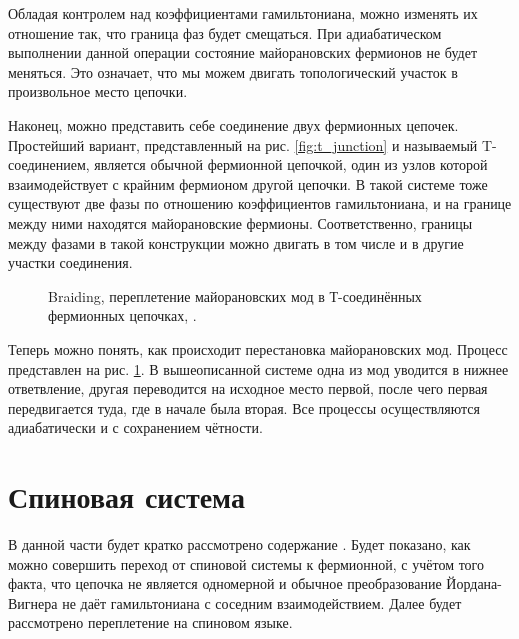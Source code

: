 \documentclass[a4paper,12pt]{article}
\theoremstyle{plain} %
\theoremstyle{definition} %
\theoremstyle{remark} %
\begin{document}
Обладая контролем над коэффициентами гамильтониана, можно изменять их отношение так, что граница фаз будет смещаться. При адиабатическом выполнении данной операции состояние майорановских фермионов не будет меняться. Это означает, что мы можем двигать топологический участок в произвольное место цепочки.

Наконец, можно представить себе соединение двух фермионных цепочек. Простейший вариант, представленный на рис. \ref{fig:t_junction} и называемый T-соединением, является обычной фермионной цепочкой, один из узлов которой взаимодействует с крайним фермионом другой цепочки. В такой системе тоже существуют две фазы по отношению коэффициентов гамильтониана, и на границе между ними находятся майорановские фермионы. Соответственно, границы между фазами в такой конструкции можно двигать в том числе и в другие участки соединения.

\begin{figure}
    \centering
    \caption{Braiding, переплетение майорановских мод в Т-соединённых фермионных цепочках, \cite{braiding}.}
    \label{fig:braiding}
\end{figure}

Теперь можно понять, как происходит перестановка майорановских мод. Процесс представлен на рис. \ref{fig:braiding}. В вышеописанной системе одна из мод уводится в нижнее ответвление, другая переводится на исходное место первой, после чего первая передвигается туда, где в начале была вторая. Все процессы осуществляются адиабатически и с сохранением чётности.


\pagebreak

\section{Спиновая система}

В данной части будет кратко рассмотрено содержание \cite{main}. Будет показано, как можно совершить переход от спиновой системы к фермионной, с учётом того факта, что цепочка не является одномерной и обычное преобразование Йордана-Вигнера не даёт гамильтониана с соседним взаимодействием. Далее будет рассмотрено переплетение на спиновом языке.
\end{document}
